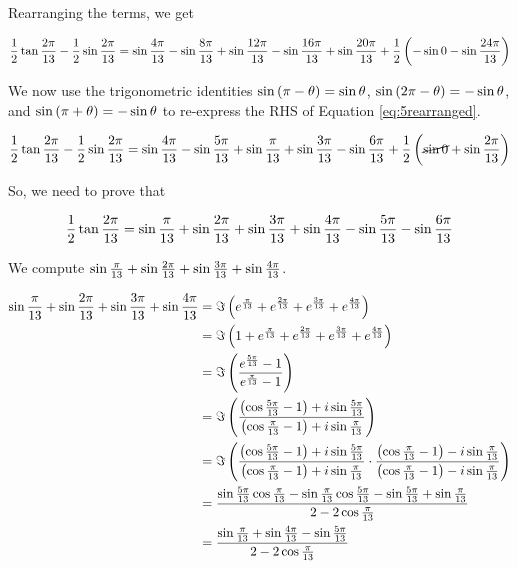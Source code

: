 \documentclass[10pt]{../usamts}
\begin{document}
\begin{solution}
Rearranging the terms, we get

\begin{equation}
    \frac{1}{2} \tan{\frac{2\pi}{13}} - \frac{1}{2} \sin{\frac{2\pi}{13}}
    = \sin{{\frac{4\pi}{13}}} - \sin{{\frac{8\pi}{13}}} + \sin{{\frac{12\pi}{13}}} - \sin{{\frac{16\pi}{13}}} + \sin{{\frac{20\pi}{13}}} + \frac{1}{2}\left( -\sin0 - \sin{{\frac{24\pi}{13}}} \right)
    \label{eq:5rearranged}
\end{equation}

We now use the trigonometric identities $\sin\left( \pi-\theta \right) = \sin{\theta}$, $\sin\left( 2\pi-\theta \right) = -\sin{\theta}$, and $\sin\left( \pi+\theta \right) = -\sin{\theta}$ to re-express the RHS of Equation \ref{eq:5rearranged}.

\begin{equation*}
    \frac{1}{2} \tan{\frac{2\pi}{13}} - \frac{1}{2} \sin{\frac{2\pi}{13}}
    = \sin{{\frac{4\pi}{13}}} - \sin{{\frac{5\pi}{13}}} + \sin{{\frac{\pi}{13}}} + \sin{{\frac{3\pi}{13}}} - \sin{{\frac{6\pi}{13}}} + \frac{1}{2}\left( \cancel{\sin0} + \sin{{\frac{2\pi}{13}}} \right)
\end{equation*} 

So, we need to prove that

\begin{equation}
    \frac{1}{2} \tan{{\frac{2\pi}{13}}}
    = \sin{{\frac{\pi}{13}}} + \sin{{\frac{2\pi}{13}}} + \sin{{\frac{3\pi}{13}}} + \sin{{\frac{4\pi}{13}}} - \sin{{\frac{5\pi}{13}}} - \sin{{\frac{6\pi}{13}}}
    \label{eq:p5intermediate}
\end{equation}

We compute $\sin{{\frac{\pi}{13}}} + \sin{{\frac{2\pi}{13}}} + \sin{{\frac{3\pi}{13}}} + \sin{{\frac{4\pi}{13}}}$.

\begin{align*}
    \sin{{\frac{\pi}{13}}} + \sin{{\frac{2\pi}{13}}} + \sin{{\frac{3\pi}{13}}} + \sin{{\frac{4\pi}{13}}}
    &=\Im\left( e^{\frac{\pi}{13}} + e^{\frac{2\pi}{13}} + e^{\frac{3\pi}{13}} + e^{\frac{4\pi}{13}} \right) \\
    &= \Im\left( 1 + e^{\frac{\pi}{13}} + e^{\frac{2\pi}{13}} + e^{\frac{3\pi}{13}} + e^{\frac{4\pi}{13}} \right)\\
    &= \Im\left( \frac{e^{\frac{5\pi}{13}} - 1}{e^{\frac{\pi}{13}} - 1} \right) \\
    &= \Im\left( \frac{\left( \cos{{\frac{5\pi}{13}}}-1 \right) + i\sin{{\frac{5\pi}{13}}}}{\left( \cos{{\frac{\pi}{13}}}-1 \right) + i\sin{{\frac{\pi}{13}}}} \right) \\
    &= \Im\left( \frac{\left( \cos{{\frac{5\pi}{13}}}-1 \right) + i\sin{{\frac{5\pi}{13}}}}{\left( \cos{{\frac{\pi}{13}}}-1 \right) + i\sin{{\frac{\pi}{13}}}}
    \cdot \frac{\left( \cos{{\frac{\pi}{13}}}-1 \right) - i\sin{{\frac{\pi}{13}}}}{\left( \cos{{\frac{\pi}{13}}}-1 \right) - i\sin{{\frac{\pi}{13}}}} \right)\\
    &= \frac{\sin{{\frac{5\pi}{13}}}\cos{{\frac{\pi}{13}}}  - \sin{{\frac{\pi}{13}}}\cos{{\frac{5\pi}{13}}} - \sin{{\frac{5\pi}{13}}} + \sin{{\frac{\pi}{13}}}}
    {2 - 2\cos{{\frac{\pi}{13}}}} \\
    &= \frac{\sin{{\frac{\pi}{13}}} + \sin{{\frac{4\pi}{13}}} - \sin{{\frac{5\pi}{13}}}} {2 - 2\cos{{\frac{\pi}{13}}}}
\end{align*}


\end{solution}
\end{document}
